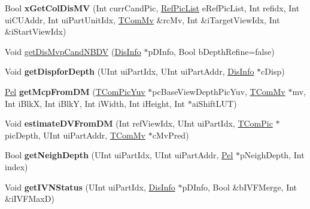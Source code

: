 \begin{DoxyCompactItemize}
\item 
\mbox{\label{class_t_com_data_c_u_a0362674c82b8a196113a650476bbfc95}} 
Bool {\bfseries x\+Get\+Col\+Dis\+MV} (Int curr\+Cand\+Pic, \hyperlink{_type_def_8h_a93cea48eb9dcfd661168dee82e41b384}{Ref\+Pic\+List} e\+Ref\+Pic\+List, Int refidx, Int ui\+C\+U\+Addr, Int ui\+Part\+Unit\+Idx, \hyperlink{class_t_com_mv}{T\+Com\+Mv} \&rc\+Mv, Int \&i\+Target\+View\+Idx, Int \&i\+Start\+View\+Idx)
\item 
Void \hyperlink{class_t_com_data_c_u_adf26ab0a4dcd8111c7b6105c7704ee62}{get\+Dis\+Mvp\+Cand\+N\+B\+DV} (\hyperlink{struct___dis_cand}{Dis\+Info} $\ast$p\+D\+Info, Bool b\+Depth\+Refine=false)
\item 
\mbox{\label{class_t_com_data_c_u_a2094727f1473a0c63c4a2c50d4ed4b85}} 
Void {\bfseries get\+Dispfor\+Depth} (U\+Int ui\+Part\+Idx, U\+Int ui\+Part\+Addr, \hyperlink{struct___dis_cand}{Dis\+Info} $\ast$c\+Disp)
\item 
\mbox{\label{class_t_com_data_c_u_acc0ef99410fd9e4a4f6fff78c515f575}} 
\hyperlink{_type_def_8h_af92141699657699b4b547be0c8517541}{Pel} {\bfseries get\+Mcp\+From\+DM} (\hyperlink{class_t_com_pic_yuv}{T\+Com\+Pic\+Yuv} $\ast$pc\+Base\+View\+Depth\+Pic\+Yuv, \hyperlink{class_t_com_mv}{T\+Com\+Mv} $\ast$mv, Int i\+BlkX, Int i\+BlkY, Int i\+Width, Int i\+Height, Int $\ast$ai\+Shift\+L\+UT)
\item 
\mbox{\label{class_t_com_data_c_u_a6e24e9fc77ad9fe6c77490a62e77f609}} 
Void {\bfseries estimate\+D\+V\+From\+DM} (Int ref\+View\+Idx, U\+Int ui\+Part\+Idx, \hyperlink{class_t_com_pic}{T\+Com\+Pic} $\ast$pic\+Depth, U\+Int ui\+Part\+Addr, \hyperlink{class_t_com_mv}{T\+Com\+Mv} $\ast$c\+Mv\+Pred)
\item 
\mbox{\label{class_t_com_data_c_u_ae5f8f692514f7344b97b7f58703f1acb}} 
Bool {\bfseries get\+Neigh\+Depth} (U\+Int ui\+Part\+Idx, U\+Int ui\+Part\+Addr, \hyperlink{_type_def_8h_af92141699657699b4b547be0c8517541}{Pel} $\ast$p\+Neigh\+Depth, Int index)
\item 
\mbox{\label{class_t_com_data_c_u_a163808c887035c2416b7ddf3892ef235}} 
Void {\bfseries get\+I\+V\+N\+Status} (U\+Int ui\+Part\+Idx, \hyperlink{struct___dis_cand}{Dis\+Info} $\ast$p\+D\+Info, Bool \&b\+I\+V\+F\+Merge, Int \&i\+I\+V\+F\+MaxD)

\end{DoxyCompactItemize}
